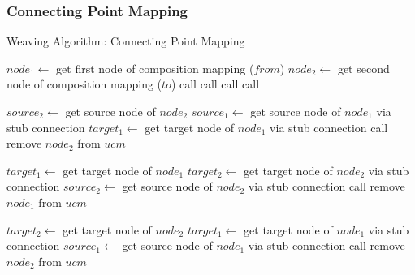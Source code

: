 \subsubsection{Connecting Point Mapping}

\begin{algorithm}
	\caption{Weaving Algorithm: Connecting Point Mapping}
	\label{alg:2}
	\begin{algorithmic}[1]
			\State $node_1\gets$ get first node of composition mapping ($from$)
			\State $node_2\gets$ get second node of composition mapping ($to$)
				 \label{alg:2.1}
					\State call  \label{alg:2.2}
				 \label{alg:2.3}
					\State call  \label{alg:2.4}
				\EndIf
				 \label{alg:2.5}
					\State call  \label{alg:2.6}
				 \label{alg:2.7}
					\State call  \label{alg:2.8}
				\EndIf
			\EndIf
		\EndFunction
		
		 \label{alg:2.9}
			\State $source_2\gets$ get source node of $node_2$
			\State $source_1\gets$ get source node of $node_1$ via stub connection
			\State $target_1\gets$ get target node of $node_1$ via stub connection
			\State call 
			\State remove $node_2$ from $ucm$
		\EndFunction \label{alg:2.10}
		
		 \label{alg:2.11}
			\State $target_1\gets$ get target node of $node_1$
			\State $target_2\gets$ get target node of $node_2$ via stub connection
			\State $source_2\gets$ get source node of $node_2$ via stub connection
			\State call 
			\State remove $node_1$ from $ucm$
		\EndFunction \label{alg:2.12}
		
		 \label{alg:2.13}
			\State $target_2\gets$ get target node of $node_2$
			\State $target_1\gets$ get target node of $node_1$ via stub connection
			\State $source_1\gets$ get source node of $node_1$ via stub connection
			\State call 
			\State remove $node_2$ from $ucm$
		\EndFunction \label{alg:2.14}
		
	\end{algorithmic}
\end{algorithm}

